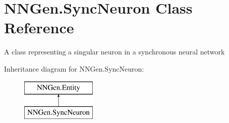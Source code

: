 \hypertarget{class_n_n_gen_1_1_sync_neuron}{}\section{N\+N\+Gen.\+Sync\+Neuron Class Reference}
\label{class_n_n_gen_1_1_sync_neuron}


A class representing a singular neuron in a synchronous neural network  


Inheritance diagram for N\+N\+Gen.\+Sync\+Neuron\+:\begin{figure}[H]
\begin{center}
\leavevmode
\includegraphics[height=2.000000cm]{class_n_n_gen_1_1_sync_neuron}
\end{center}
\end{figure}
